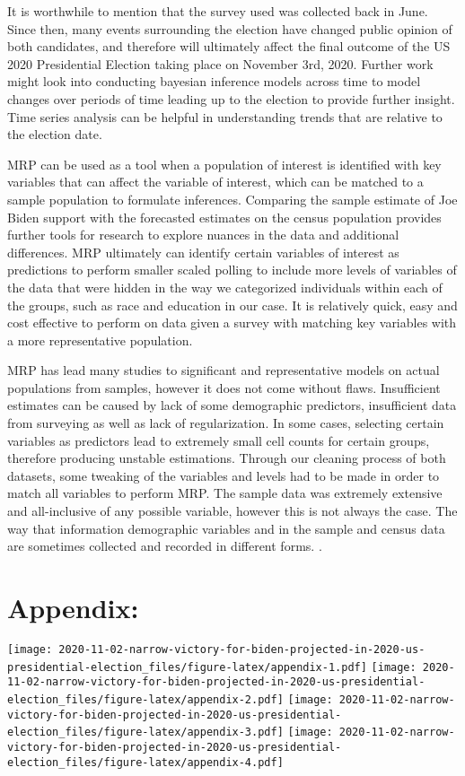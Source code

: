 \documentclass[
]{article}
\begin{document}
It is worthwhile to mention that the survey used was collected back in June. Since then, many events surrounding the election have changed public opinion of both candidates, and therefore will ultimately affect the final outcome of the US 2020 Presidential Election taking place on November 3rd, 2020. Further work might look into conducting bayesian inference models across time to model changes over periods of time leading up to the election to provide further insight. Time series analysis can be helpful in understanding trends that are relative to the election date.

MRP can be used as a tool when a population of interest is identified with key variables that can affect the variable of interest, which can be matched to a sample population to formulate inferences. Comparing the sample estimate of Joe Biden support with the forecasted estimates on the census population provides further tools for research to explore nuances in the data and additional differences. MRP ultimately can identify certain variables of interest as predictions to perform smaller scaled polling to include more levels of variables of the data that were hidden in the way we categorized individuals within each of the groups, such as race and education in our case. It is relatively quick, easy and cost effective to perform on data given a survey with matching key variables with a more representative population.

MRP has lead many studies to significant and representative models on actual populations from samples, however it does not come without flaws. Insufficient estimates can be caused by lack of some demographic predictors, insufficient data from surveying as well as lack of regularization. In some cases, selecting certain variables as predictors lead to extremely small cell counts for certain groups, therefore producing unstable estimations. Through our cleaning process of both datasets, some tweaking of the variables and levels had to be made in order to match all variables to perform MRP. The sample data was extremely extensive and all-inclusive of any possible variable, however this is not always the case. The way that information demographic variables and in the sample and census data are sometimes collected and recorded in different forms. \citep{citeLKennedy} \citep{citeAGelman}.

\hypertarget{appendix}{%
\section{Appendix:}\label{appendix}}

\texttt{[image: 2020-11-02-narrow-victory-for-biden-projected-in-2020-us-presidential-election\_files/figure-latex/appendix-1.pdf]} \texttt{[image: 2020-11-02-narrow-victory-for-biden-projected-in-2020-us-presidential-election\_files/figure-latex/appendix-2.pdf]} \texttt{[image: 2020-11-02-narrow-victory-for-biden-projected-in-2020-us-presidential-election\_files/figure-latex/appendix-3.pdf]} \texttt{[image: 2020-11-02-narrow-victory-for-biden-projected-in-2020-us-presidential-election\_files/figure-latex/appendix-4.pdf]}

  
\end{document}
